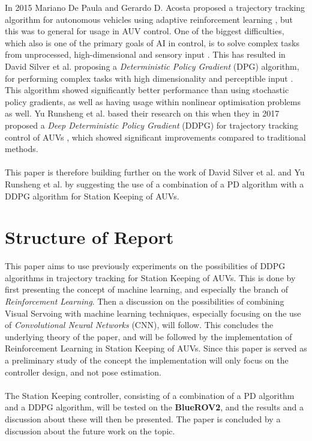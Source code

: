 In 2015 Mariano De Paula and Gerardo D. Acosta proposed a trajectory tracking algorithm for autonomous vehicles using adaptive reinforcement learning \cite{Paula}, but this was to general for usage in AUV control. One of the biggest difficulties, which also is one of the primary goals of AI in control, is to solve complex tasks from unprocessed, high-dimensional and sensory input \cite{Lillicrap}. This has resulted in David Silver et al. proposing a \textit{Deterministic Policy Gradient} (DPG) algorithm, for performing complex tasks with high dimensionality and perceptible input \cite{David}. This algorithm showed significantly better performance than using stochastic policy gradients, as well as having usage within nonlinear optimisation problems as well. Yu Runsheng et al. based their research on this when they in 2017 proposed a \textit{Deep Deterministic Policy Gradient} (DDPG) for trajectory tracking control of AUVs \cite{Yu}, which showed significant improvements compared to traditional methods.\\\\
This paper is therefore building further on the work of David Silver et al. and Yu Runsheng et al. by suggesting the use of a combination of a PD algorithm with a DDPG algorithm for Station Keeping of AUVs.   
\section{Structure of Report}
This paper aims to use previously experiments on the possibilities of DDPG algorithms in trajectory tracking for Station Keeping of AUVs. This is done by first presenting the concept of machine learning, and especially the branch of \textit{Reinforcement Learning}. Then a discussion on the possibilities of combining Visual Servoing with machine learning techniques, especially focusing on the use of \textit{Convolutional Neural Networks} (CNN), will follow. This concludes the underlying theory of the paper, and will be followed by the implementation of Reinforcement Learning in Station Keeping of AUVs. Since this paper is served as a preliminary study of the concept the implementation will only focus on the controller design, and not pose estimation.\\\\
The Station Keeping controller, consisting of a combination of a PD algorithm and a DDPG algorithm, will be tested on the \textbf{BlueROV2}, and the results and a discussion about these will then be presented. The paper is concluded by a discussion about the future work on the topic. 
